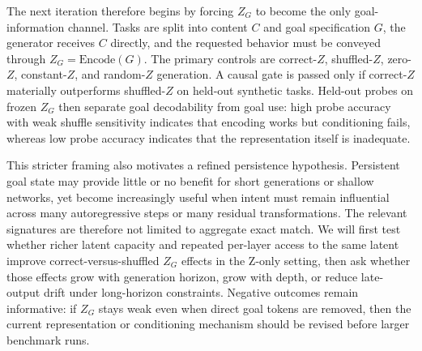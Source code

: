 \documentclass[11pt]{article}
\begin{document}
The next iteration therefore begins by forcing $Z_G$ to become the only goal-information channel. Tasks are split into content $C$ and goal specification $G$, the generator receives $C$ directly, and the requested behavior must be conveyed through $Z_G=\mathrm{Encode}(G)$. The primary controls are correct-$Z$, shuffled-$Z$, zero-$Z$, constant-$Z$, and random-$Z$ generation. A causal gate is passed only if correct-$Z$ materially outperforms shuffled-$Z$ on held-out synthetic tasks. Held-out probes on frozen $Z_G$ then separate goal decodability from goal use: high probe accuracy with weak shuffle sensitivity indicates that encoding works but conditioning fails, whereas low probe accuracy indicates that the representation itself is inadequate.

This stricter framing also motivates a refined persistence hypothesis. Persistent goal state may provide little or no benefit for short generations or shallow networks, yet become increasingly useful when intent must remain influential across many autoregressive steps or many residual transformations. The relevant signatures are therefore not limited to aggregate exact match. We will first test whether richer latent capacity and repeated per-layer access to the same latent improve correct-versus-shuffled $Z_G$ effects in the Z-only setting, then ask whether those effects grow with generation horizon, grow with depth, or reduce late-output drift under long-horizon constraints. Negative outcomes remain informative: if $Z_G$ stays weak even when direct goal tokens are removed, then the current representation or conditioning mechanism should be revised before larger benchmark runs.
\end{document}
